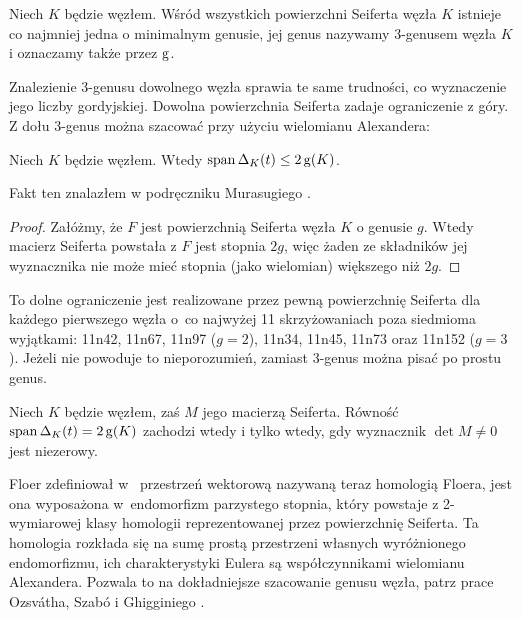 \begin{definition}[3-genus]
    Niech $K$ będzie węzłem.
    Wśród wszystkich powierzchni Seiferta węzła $K$ istnieje co najmniej jedna o minimalnym genusie, jej genus nazywamy 3-genusem węzła $K$ i oznaczamy także przez $\operatorname{g}$.
\end{definition}

Znalezienie 3-genusu dowolnego węzła sprawia te same trudności, co wyznaczenie jego liczby gordyjskiej.
Dowolna powierzchnia Seiferta zadaje ograniczenie z góry.
Z dołu 3-genus można szacować przy użyciu wielomianu Alexandera:

\begin{proposition}
    \label{prp:alexander_genus}
    Niech $K$ będzie węzłem.
    Wtedy $\operatorname{span} \Delta_K(t) \le 2\operatorname{g}(K)$.
\end{proposition}

Fakt ten znalazłem w podręczniku Murasugiego \cite[s. 131]{murasugi96}.

\begin{proof}
    Załóżmy, że $F$ jest powierzchnią Seiferta węzła $K$ o genusie $g$.
    Wtedy macierz Seiferta powstała z $F$ jest stopnia $2g$, więc żaden ze składników jej wyznacznika nie może mieć stopnia (jako wielomian) większego niż $2g$.
\end{proof}

To dolne ograniczenie jest realizowane przez pewną powierzchnię Seiferta dla każdego pierwszego węzła o~co najwyżej 11 skrzyżowaniach poza siedmioma wyjątkami: 11n42, 11n67, 11n97 ($g = 2$), 11n34, 11n45, 11n73 oraz 11n152 ($g = 3$).
Jeżeli nie powoduje to nieporozumień, zamiast 3-genus można pisać po prostu genus.

\begin{proposition}
    Niech $K$ będzie węzłem, zaś $M$ jego macierzą Seiferta.
    Równość $\operatorname{span} \Delta_K(t) = 2\operatorname{g}(K)$ zachodzi wtedy i tylko wtedy, gdy wyznacznik $\det M \neq 0$ jest niezerowy.
\end{proposition}

Floer zdefiniował w~\cite{floer90} przestrzeń wektorową nazywaną teraz homologią Floera, jest ona wyposażona w~endomorfizm parzystego stopnia, który powstaje z 2-wymiarowej klasy homologii reprezentowanej przez powierzchnię Seiferta.
Ta homologia rozkłada się na sumę prostą przestrzeni własnych wyróżnionego endomorfizmu, ich charakterystyki Eulera są współczynnikami wielomianu Alexandera.
Pozwala to na dokładniejsze szacowanie genusu węzła, patrz prace Ozsvátha, Szabó \cite{szabo03} i Ghigginiego \cite{ghiggini08}.

